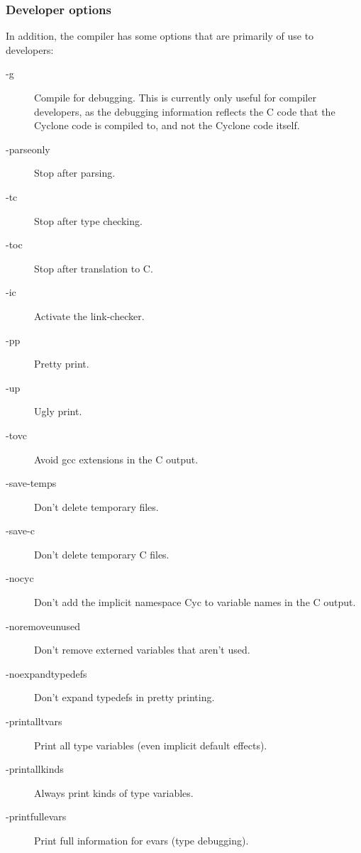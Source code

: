 \subsubsection*{Developer options}

In addition, the compiler has some options that are primarily of use
to developers:
\begin{description}
\item[-g]
  Compile for debugging.  This is currently only useful for compiler
  developers, as the debugging information reflects the C code that
  the Cyclone code is compiled to, and not the Cyclone code itself.
\item[-parseonly] 
  Stop after parsing.
\item[-tc]
  Stop after type checking.
\item[-toc]
  Stop after translation to C\@.
\item[-ic]
  Activate the link-checker.
\item[-pp]
  Pretty print.
\item[-up]
  Ugly print.
\item[-tovc]
  Avoid gcc extensions in the C output.
\item[-save-temps]
  Don't delete temporary files.
\item[-save-c]
  Don't delete temporary C files.
\item[-nocyc]
  Don't add the implicit namespace Cyc to variable names in the C output.
\item[-noremoveunused] 
  Don't remove externed variables that aren't used.
\item[-noexpandtypedefs] 
  Don't expand typedefs in pretty printing.
\item[-printalltvars] 
  Print all type variables (even implicit default effects).
\item[-printallkinds] 
  Always print kinds of type variables.
\item[-printfullevars] 
  Print full information for evars (type debugging).
\end{description}

